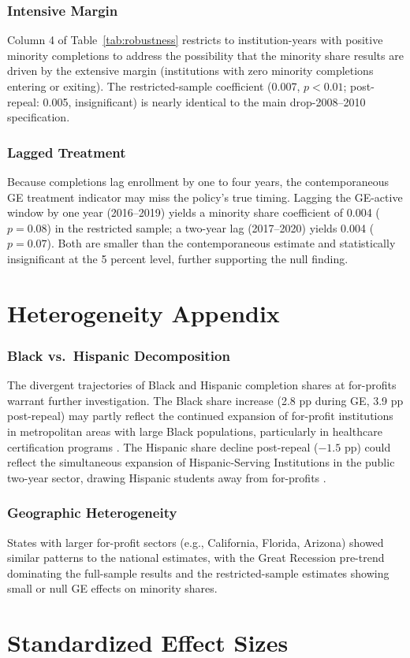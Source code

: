 \documentclass[12pt]{article}
\begin{document}
\subsubsection*{Intensive Margin} Column 4 of Table~\ref{tab:robustness} restricts to institution-years with positive minority completions to address the possibility that the minority share results are driven by the extensive margin (institutions with zero minority completions entering or exiting). The restricted-sample coefficient (0.007, $p < 0.01$; post-repeal: 0.005, insignificant) is nearly identical to the main drop-2008--2010 specification.

\subsubsection*{Lagged Treatment} Because completions lag enrollment by one to four years, the contemporaneous GE treatment indicator may miss the policy's true timing. Lagging the GE-active window by one year (2016--2019) yields a minority share coefficient of 0.004 ($p = 0.08$) in the restricted sample; a two-year lag (2017--2020) yields 0.004 ($p = 0.07$). Both are smaller than the contemporaneous estimate and statistically insignificant at the 5 percent level, further supporting the null finding.


\section{Heterogeneity Appendix}
\label{sec:het_appendix}

\subsubsection*{Black vs.\ Hispanic Decomposition} The divergent trajectories of Black and Hispanic completion shares at for-profits warrant further investigation. The Black share increase (2.8 pp during GE, 3.9 pp post-repeal) may partly reflect the continued expansion of for-profit institutions in metropolitan areas with large Black populations, particularly in healthcare certification programs \citep{CottomMcMillan2017, DemingGoldinKatz2012}. The Hispanic share decline post-repeal ($-1.5$ pp) could reflect the simultaneous expansion of Hispanic-Serving Institutions in the public two-year sector, drawing Hispanic students away from for-profits \citep{BaumSandy2017}.

\subsubsection*{Geographic Heterogeneity} States with larger for-profit sectors (e.g., California, Florida, Arizona) showed similar patterns to the national estimates, with the Great Recession pre-trend dominating the full-sample results and the restricted-sample estimates showing small or null GE effects on minority shares.


\section{Standardized Effect Sizes}
\label{sec:sde}


\end{document}
